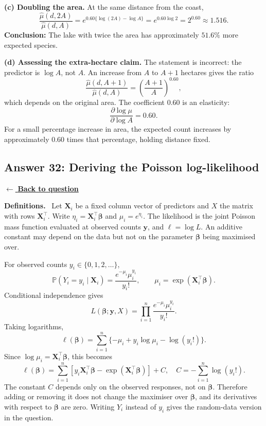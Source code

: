 \documentclass[11pt,a4paper]{article}
\newcommand{\given}{\mathrel{|}}
\newcommand{\answernav}[1]{%
  \label{answer:#1}%
  \noindent\hyperref[question:#1]{$\leftarrow$ \textbf{Back to question}}%
  \par\smallskip}
\newcommand{\studyheading}[1]{%
  \par\medskip\noindent\textcolor{statblue}{\textbf{#1.}}\ }
\begin{document}
\textbf{(c) Doubling the area.}
At the same distance from the coast,
\[
\frac{\widehat\mu(d,2A)}{\widehat\mu(d,A)}
=e^{0.60\{\log(2A)-\log A\}}
=e^{0.60\log2}=2^{0.60}\approx1.516.
\]
\textbf{Conclusion:} The lake with twice the area has approximately
$51.6\%$ more expected species.

\textbf{(d) Assessing the extra-hectare claim.}
The statement is incorrect: the predictor is $\log A$, not $A$.
An increase from $A$ to $A+1$ hectares gives the ratio
\[
\frac{\widehat\mu(d,A+1)}{\widehat\mu(d,A)}
=\left(\frac{A+1}{A}\right)^{0.60},
\]
which depends on the original area. The coefficient $0.60$ is an
elasticity:
\[
\frac{\partial\log\mu}{\partial\log A}=0.60.
\]
For a small percentage increase in area, the expected count increases
by approximately $0.60$ times that percentage, holding distance fixed.

\clearpage

\subsection{Answer 32: Deriving the Poisson log-likelihood}
\answernav{32}

\studyheading{Definitions}
Let $\mathbf X_i$ be a fixed column vector of predictors and $X$ the matrix with rows $\mathbf X_i^\top$.
Write $\eta_i=\mathbf X_i^\top\boldsymbol\beta$ and $\mu_i=e^{\eta_i}$.
The likelihood is the joint Poisson mass function evaluated at observed counts $\mathbf y$, and $\ell=\log L$.
An additive constant may depend on the data but not on the parameter $\boldsymbol\beta$ being maximised over.

For observed counts $y_i\in\{0,1,2,\ldots\}$,
\[
\mathbb{P}(Y_i=y_i\given\mathbf X_i)
=\frac{e^{-\mu_i}\mu_i^{y_i}}{y_i!},
\qquad \mu_i=\exp(\mathbf X_i^\top\boldsymbol\beta).
\]
Conditional independence gives
\[
L(\boldsymbol\beta;\mathbf y,X)
=\prod_{i=1}^n\frac{e^{-\mu_i}\mu_i^{y_i}}{y_i!}.
\]
Taking logarithms,
\[
\ell(\boldsymbol\beta)
=\sum_{i=1}^n\{-\mu_i+y_i\log\mu_i-\log(y_i!)\}.
\]
Since $\log\mu_i=\mathbf X_i^\top\boldsymbol\beta$, this becomes
\[
\boxed{
\ell(\boldsymbol\beta)
=\sum_{i=1}^n
\left[y_i\mathbf X_i^\top\boldsymbol\beta
-\exp(\mathbf X_i^\top\boldsymbol\beta)\right]+C,
\quad C=-\sum_{i=1}^n\log(y_i!).
}
\]
The constant $C$ depends only on the observed responses, not on
$\boldsymbol\beta$. Therefore adding or removing it does not change the
maximiser over $\boldsymbol\beta$, and its derivatives with respect to
$\boldsymbol\beta$ are zero. Writing $Y_i$ instead of $y_i$ gives the
random-data version in the question.
\end{document}
